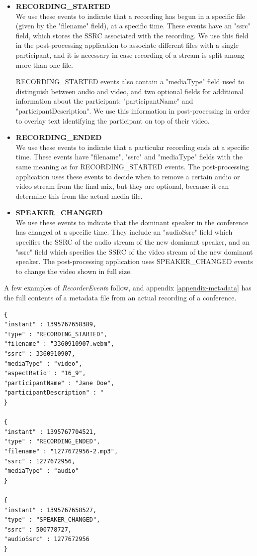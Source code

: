 \documentclass[twoside,openright,a4paper,12pt,english]{article}
\begin{document}
\begin{itemize}
\smallskip
\item \textbf{RECORDING\_STARTED} \\
We use these events to indicate that a recording has begun in a specific file
(given by the "filename" field), at a specific time. These events have an "ssrc" field,
which stores the SSRC associated with the recording. We use this field in the post-processing
application to associate different files with a single participant, and it is
necessary in case recording of a stream is split among more than one file.

RECORDING\_STARTED events also contain a "mediaType" field used to distinguish between audio and
video, and two optional fields for additional information about the
participant: "participantName" and "participantDescription". We use this information
in post-processing in order to overlay text identifying the participant on top of
their video.

\smallskip
\item \textbf{RECORDING\_ENDED} \\
We use these events to indicate that a particular recording ends at a specific
time. These events have "filename", "ssrc" and "mediaType" fields with the same meaning
as for RECORDING\_STARTED events. The post-processing application uses these
events to decide when to remove a certain audio or video stream from the final mix, but they
are optional, because it can determine this from the actual media file.

\smallskip
\item \textbf{SPEAKER\_CHANGED} \\
We use these events to indicate that the dominant speaker in the conference has
changed at a specific time. They include an "audioSsrc" field which specifies
the SSRC of the audio stream of the new dominant speaker, and an "ssrc" field
which specifies the SSRC of the video stream of the new dominant
speaker. The post-processing application uses SPEAKER\_CHANGED events to change
the video shown in full size.
\end{itemize}

A few examples of \emph{RecorderEvent}s follow, and appendix
\ref{appendix-metadata} has the full contents of a metadata file from an
actual recording of a conference.

\begin{verbatim}
{
"instant" : 1395767658389,
"type" : "RECORDING_STARTED",
"filename" : "3360910907.webm",
"ssrc" : 3360910907,
"mediaType" : "video",
"aspectRatio" : "16_9",
"participantName" : "Jane Doe",
"participantDescription" : "
}

{
"instant" : 1395767704521,
"type" : "RECORDING_ENDED",
"filename" : "1277672956-2.mp3",
"ssrc" : 1277672956,
"mediaType" : "audio"
}

{
"instant" : 1395767658527,
"type" : "SPEAKER_CHANGED",
"ssrc" : 500778727,
"audioSsrc" : 1277672956
}
\end{verbatim}
\end{document}
